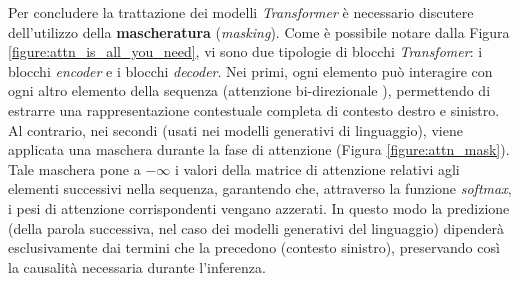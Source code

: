 Per concludere la trattazione dei modelli \textit{Transformer} è necessario discutere dell'utilizzo della \textbf{mascheratura} (\textit{masking}). Come è possibile
notare dalla Figura \ref{figure:attn_is_all_you_need}, vi sono due tipologie di
blocchi \textit{Transfomer}: i blocchi \textit{encoder} e i blocchi
\textit{decoder}. Nei primi, ogni elemento può interagire con ogni altro
elemento della sequenza (attenzione bi-direzionale \cite{devlin2019bertpretrainingdeepbidirectional}), permettendo di estrarre
una rappresentazione contestuale completa di contesto destro e sinistro. Al
contrario, nei secondi (usati nei modelli generativi di linguaggio), viene
applicata una maschera durante la fase di attenzione (Figura
\ref{figure:attn_mask}). Tale maschera pone a $-\infty$ i valori della matrice
di attenzione relativi agli elementi successivi nella sequenza, garantendo che,
attraverso la funzione \textit{softmax}, i pesi di attenzione corrispondenti
vengano azzerati. In questo modo la predizione (della parola successiva, nel
caso dei modelli generativi del linguaggio) dipenderà esclusivamente dai
termini che la precedono (contesto sinistro), preservando così la causalità
necessaria durante l'inferenza.
